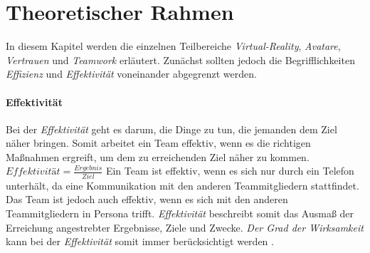 \documentclass[a4paper,11pt]{article}%
\renewcommand{\\}{\vspace*{0.5\baselineskip} \newline}
\begin{document}
%
%
%
%

	\newpage
\section{Theoretischer Rahmen}

In diesem Kapitel werden die einzelnen Teilbereiche \textit{Virtual-Reality}, \textit{Avatare}, \textit{Vertrauen} und \textit{Teamwork} erläutert.
Zunächst sollten jedoch die Begrifflichkeiten \textit{Effizienz} und \textit{Effektivität} voneinander abgegrenzt werden.
%

\paragraph{Effektivität}
Bei der \textit{Effektivität} geht es darum, die Dinge zu tun, die jemanden dem Ziel näher bringen. 
Somit arbeitet ein Team effektiv, wenn es die richtigen Maßnahmen ergreift, um dem zu erreichenden Ziel näher zu kommen.\\
$Effektivität = \frac{Ergebnis}{Ziel}$ \\
Ein Team ist effektiv, wenn es sich nur durch ein Telefon unterhält, da eine Kommunikation mit den anderen Teammitgliedern stattfindet. Das Team ist jedoch auch effektiv, wenn es sich mit den anderen Teammitgliedern in Persona trifft.
\textit{Effektivität} beschreibt somit das Ausmaß der Erreichung angestrebter Ergebnisse, Ziele und Zwecke.
\textit{Der Grad der Wirksamkeit} kann bei der \textit{Effektivität} somit immer berücksichtigt werden \citep[S.183]{eichhorn2005prinzip}.
\end{document}

